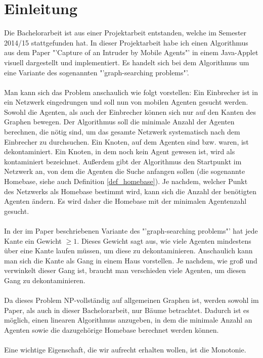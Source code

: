 \section{Einleitung}
Die Bachelorarbeit ist aus einer Projektarbeit entstanden, welche im Semester 2014/15 stattgefunden hat.
In dieser Projektarbeit habe ich einen Algorithmus aus dem Paper "'Capture of an Intruder by Mobile Agents"' \cite{cima_paper} in einem Java-Applet visuell dargestellt und implementiert. Es handelt sich bei dem Algorithmus um eine Variante des sogenannten "'graph-searching problems"'.
\\
\\
Man kann sich das Problem anschaulich wie folgt vorstellen: Ein Einbrecher ist in ein Netzwerk eingedrungen und soll nun von mobilen Agenten gesucht werden. Sowohl die Agenten, als auch der Einbrecher können sich nur auf den Kanten des Graphen bewegen. Der Algorithmus soll die minimale Anzahl der Agenten berechnen, die nötig sind, um das gesamte Netzwerk systematisch nach dem Einbrecher zu durchsuchen. Ein Knoten, auf dem Agenten sind bzw. waren, ist dekontaminiert. Ein Knoten, in dem noch kein Agent gewesen ist, wird als kontaminiert bezeichnet. Außerdem gibt der Algorithmus den Startpunkt im Netzwerk an, von dem die Agenten die Suche anfangen sollen (die sogenannte Homebase, siehe auch Definition \ref{def_homebase}). Je nachdem, welcher Punkt des Netzwerks als Homebase bestimmt wird, kann sich die Anzahl der benötigten Agenten ändern. Es wird daher die Homebase mit der minimalen Agentenzahl gesucht.
\\
\\
In der im Paper beschriebenen Variante des "'graph-searching problems"' hat jede Kante ein Gewicht $\geq 1$. Dieses Gewicht sagt aus, wie viele Agenten mindestens über eine Kante laufen müssen, um diese zu dekontaminieren. Anschaulich kann man sich die Kante als Gang in einem Haus vorstellen. Je nachdem, wie groß und verwinkelt dieser Gang ist, braucht man verschieden viele Agenten, um diesen Gang zu dekontaminieren.
\\
\\
Da dieses Problem NP-vollständig auf allgemeinen Graphen ist, werden sowohl im Paper, als auch in dieser Bachelorarbeit, nur Bäume betrachtet. Dadurch ist es möglich, einen linearen Algorithmus anzugeben, in dem die minimale Anzahl an Agenten sowie die dazugehörige Homebase berechnet werden können.
\\
\\
Eine wichtige Eigenschaft, die wir aufrecht erhalten wollen, ist die Monotonie. 
